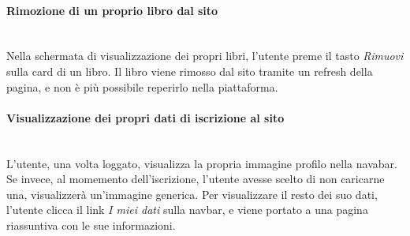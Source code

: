 \paragraph{Rimozione di un proprio libro dal sito}\mbox{}\\
\label{par:RimuoLibro}
Nella schermata di visualizzazione dei propri libri, l'utente preme il tasto \textit{Rimuovi} sulla card di un libro. Il libro viene rimosso dal sito tramite un refresh della pagina, e non è più possibile reperirlo nella piattaforma.

\paragraph{Visualizzazione dei propri dati di iscrizione al sito}\mbox{}\\
\label{par:VisDati}
L'utente, una volta loggato, visualizza la propria immagine profilo nella navabar. Se invece, al momemento dell'iscrizione, l'utente avesse scelto di non caricarne una, visualizzerà un'immagine generica.
Per visualizzare il resto dei suo dati, l'utente clicca il link \textit{I miei dati} sulla navbar, e viene portato a una pagina riassuntiva con le sue informazioni.







